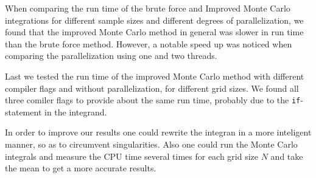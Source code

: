 \documentclass[10pt, twocolumn]{aastex62}
\begin{document}
When comparing the run time of the brute force and Improved Monte Carlo
integrations for different sample sizes and different degrees of
parallelization, we found that the improved Monte Carlo method in general was
slower in run time than the brute force method. However, a notable speed up was
noticed when comparing the parallelization using one and two threads.

Last we tested the run time of the improved Monte Carlo method with different
compiler flags and without parallelization, for different grid sizes. We found
all three comiler flags to provide about the same run time, probably due to the
\texttt{if}-statement in the integrand.

In order to improve our results one could rewrite the integran in a more
inteligent manner, so as to circumvent singularities. Also one could run the
Monte Carlo integrals and measure the CPU time several times for each grid size
$N$ and take the mean to get a more accurate results.



\prntlen{\textwidth}
\nocite{jensen:2019}


\end{document}
